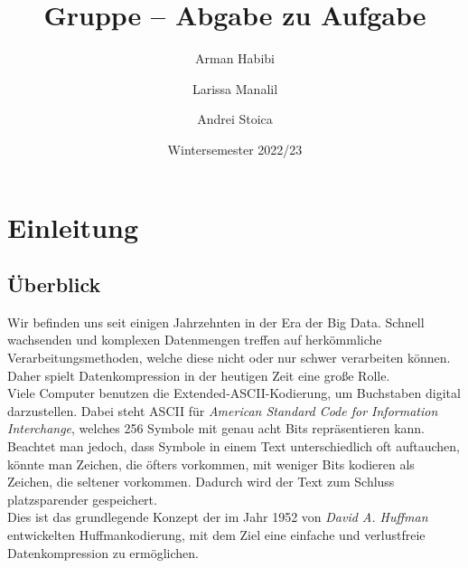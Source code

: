 \documentclass[course=erap]{aspdoc}
\author{Arman Habibi \and Larissa Manalil \and Andrei Stoica}
\date{Wintersemester 2022/23}
\title{Gruppe \theGroup{} -- Abgabe zu Aufgabe \theNumber}
\begin{document}
\maketitle

\section{Einleitung}
\subsection{Überblick}

Wir befinden uns seit einigen Jahrzehnten in der Era der Big Data. Schnell wachsenden und komplexen Datenmengen treffen auf herkömmliche Verarbeitungsmethoden, welche diese nicht oder nur schwer verarbeiten können. Daher spielt Datenkompression in der heutigen Zeit eine große Rolle.\\
Viele Computer benutzen die Extended-ASCII-Kodierung, um Buchstaben digital darzustellen. Dabei steht ASCII für \textit{American Standard Code for Information Interchange}, welches 256 Symbole mit genau acht Bits repräsentieren kann. Beachtet man jedoch, dass Symbole in einem Text unterschiedlich oft auftauchen, könnte man Zeichen, die öfters vorkommen, mit weniger Bits kodieren als Zeichen, die seltener vorkommen. Dadurch wird der Text zum Schluss platzsparender gespeichert.\\
Dies ist das grundlegende Konzept der im Jahr 1952 von \textit{David A. Huffman} entwickelten Huffmankodierung, mit dem Ziel eine einfache und verlustfreie Datenkompression zu ermöglichen.
\end{document}
